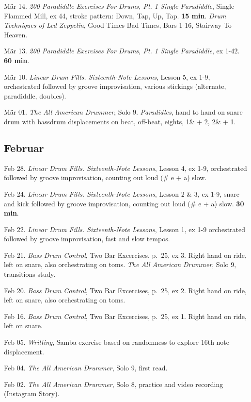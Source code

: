\documentclass[
]{book}
\begin{document}
Mär 14. \emph{200 Paradiddle Exercises For Drums, Pt. 1 Single Paradiddle}, Single Flammed Mill, ex 44, stroke pattern: Down, Tap, Up, Tap. \textbf{15 min}. \emph{Drum Techniques of Led Zeppelin}, Good Times Bad Times, Bars 1-16, Stairway To Heaven.

Mär 13. \emph{200 Paradiddle Exercises For Drums, Pt. 1 Single Paradiddle}, ex 1-42. \textbf{60 min}.

Mär 10. \emph{Linear Drum Fills. Sixteenth-Note Lessons}, Lesson 5, ex 1-9, orchestrated followed by groove improvisation, various stickings (alternate, paradiddle, doubles).

Mär 01. \emph{The All American Drummer}, Solo 9. \emph{Paradidles}, hand to hand on snare drum with bassdrum displacements on beat, off-beat, eights, 1\& + 2, 2\& + 1.

\hypertarget{februar-2023}{%
\subsection*{Februar}\label{februar-2023}}

Feb 28. \emph{Linear Drum Fills. Sixteenth-Note Lessons}, Lesson 4, ex 1-9, orchestrated followed by groove improvisation, counting out loud (\# e + a) slow.

Feb 24. \emph{Linear Drum Fills. Sixteenth-Note Lessons}, Lesson 2 \& 3, ex 1-9, snare and kick followed by groove improvisation, counting out loud (\# e + a) slow. \textbf{30 min}.

Feb 22. \emph{Linear Drum Fills. Sixteenth-Note Lessons}, Lesson 1, ex 1-9 orchestrated followed by groove improvisation, fast and slow tempos.

Feb 21. \emph{Bass Drum Control}, Two Bar Excercises, p.~25, ex 3. Right hand on ride, left on snare, also orchestrating on toms. \emph{The All American Drummer}, Solo 9, transitions study.

Feb 20. \emph{Bass Drum Control}, Two Bar Excercises, p.~25, ex 2. Right hand on ride, left on snare, also orchestrating on toms.

Feb 16. \emph{Bass Drum Control}, Two Bar Excercises, p.~25, ex 1. Right hand on ride, left on snare.

Feb 05. \emph{Writting}, Samba exercise based on randomness to explore 16th note displacement.

Feb 04. \emph{The All American Drummer}, Solo 9, first read.

Feb 02. \emph{The All American Drummer}, Solo 8, practice and video recording (Instagram Story).
\end{document}

